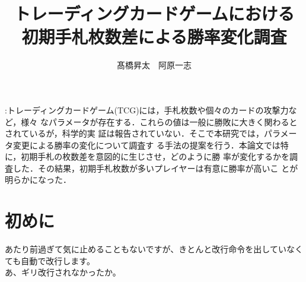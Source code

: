 \documentclass{ltjsarticle}
\begin{document}
\title{\bf
{トレーディングカードゲームにおける
\\初期手札枚数差による勝率変化調査} 
}
\author{髙橋昇太　阿原一志}
\date{}
\maketitle
\abstractname{:トレーディングカードゲーム(TCG)には，手札枚数や個々のカードの攻撃力など，様々
なパラメータが存在する．これらの値は一般に勝敗に大きく関わるとされているが，科学的実
証は報告されていない．そこで本研究では，パラメータ変更による勝率の変化について調査す
る手法の提案を行う．本論文では特に，初期手札の枚数差を意図的に生じさせ，どのように勝
率が変化するかを調査した．その結果，初期手札枚数が多いプレイヤーは有意に勝率が高いこ
とが明らかになった．}

\section{初めに}
あたり前過ぎて気に止めることもないですが、きとんと改行命令を出していなくても自動で改行します。
\\あ、ギリ改行されなかったか。
\end{document}
